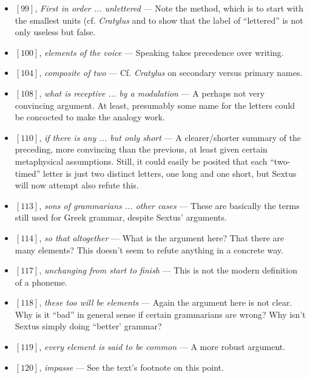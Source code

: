 \documentclass[12pt]{article}
\begin{document}
\begin{itemize}

\item $[99]$, \textit{First in order ... unlettered} --- Note the method, which is to start with the smallest units (cf. \textit{Cratylus} and to show that the label of ``lettered'' is not only useless but false.

\item $[100]$, \textit{elements of the voice} --- Speaking takes precedence over writing.

\item $[104]$, \textit{composite of two} --- Cf. \textit{Cratylus} on secondary versus primary names.

\item $[108]$, \textit{what is receptive ... by a modulation} --- A perhaps not very convincing argument. At least, presumably some name for the letters could be concocted to make the analogy work.

\item $[110]$, \textit{if there is any ... but only short} --- A clearer/shorter summary of the preceding, more convincing than the previous, at least given certain metaphysical assumptions. Still, it could easily be posited that each ``two-timed'' letter is just two distinct letters, one long and one short, but Sextus will now attempt also refute this.

\item $[113]$, \textit{sons of grammarians ... other cases} --- These are basically the terms still used for Greek grammar, despite Sextus' arguments.

\item $[114]$, \textit{so that altogether} --- What is the argument here? That there are many elements? This doesn't seem to refute anything in a concrete way.

\item $[117]$, \textit{unchanging from start to finish} --- This is not the modern definition of a phoneme.

\item $[118]$, \textit{these too will be elements} --- Again the argument here is not clear. Why is it ``bad'' in general sense if certain grammarians are wrong? Why isn't Sextus simply doing ``better' grammar?

\item $[119]$, \textit{every element is said to be common} --- A more robust argument.

\item $[120]$, \textit{impasse} --- See the text's footnote on this point.


\end{itemize}
\end{document}
